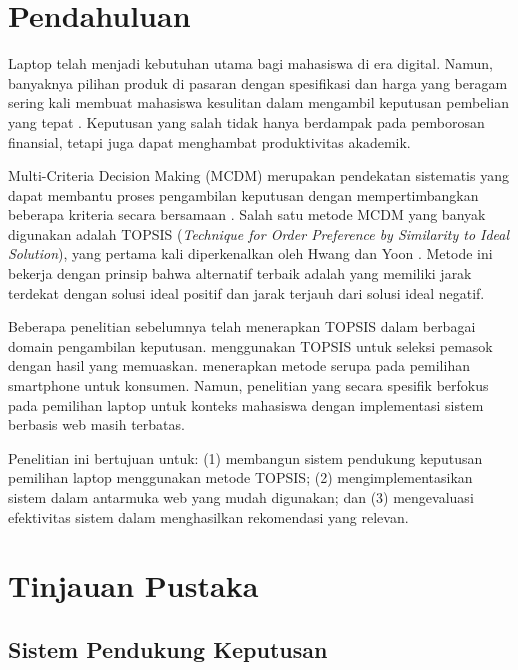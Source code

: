 \documentclass[10pt, a4paper, twocolumn]{article}
\begin{document}
\section{Pendahuluan}

Laptop telah menjadi kebutuhan utama bagi mahasiswa di era digital. Namun, banyaknya pilihan produk di pasaran dengan spesifikasi dan harga yang beragam sering kali membuat mahasiswa kesulitan dalam mengambil keputusan pembelian yang tepat \cite{turban2005}. Keputusan yang salah tidak hanya berdampak pada pemborosan finansial, tetapi juga dapat menghambat produktivitas akademik.

Multi-Criteria Decision Making (MCDM) merupakan pendekatan sistematis yang dapat membantu proses pengambilan keputusan dengan mempertimbangkan beberapa kriteria secara bersamaan \cite{hwang1981}. Salah satu metode MCDM yang banyak digunakan adalah TOPSIS (\textit{Technique for Order Preference by Similarity to Ideal Solution}), yang pertama kali diperkenalkan oleh Hwang dan Yoon \cite{hwang1981}. Metode ini bekerja dengan prinsip bahwa alternatif terbaik adalah yang memiliki jarak terdekat dengan solusi ideal positif dan jarak terjauh dari solusi ideal negatif.

Beberapa penelitian sebelumnya telah menerapkan TOPSIS dalam berbagai domain pengambilan keputusan. \cite{previous1} menggunakan TOPSIS untuk seleksi pemasok dengan hasil yang memuaskan. \cite{previous2} menerapkan metode serupa pada pemilihan smartphone untuk konsumen. Namun, penelitian yang secara spesifik berfokus pada pemilihan laptop untuk konteks mahasiswa dengan implementasi sistem berbasis web masih terbatas.

Penelitian ini bertujuan untuk: (1) membangun sistem pendukung keputusan pemilihan laptop menggunakan metode TOPSIS; (2) mengimplementasikan sistem dalam antarmuka web yang mudah digunakan; dan (3) mengevaluasi efektivitas sistem dalam menghasilkan rekomendasi yang relevan.

\section{Tinjauan Pustaka}

\subsection{Sistem Pendukung Keputusan}
\end{document}
